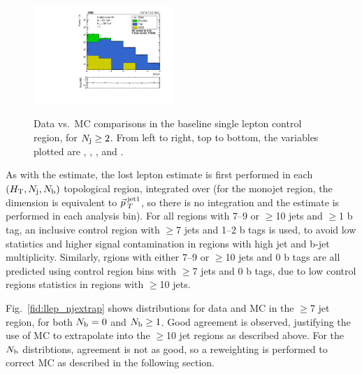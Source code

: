 \begin{figure}[ht]
\begin{center}
    \includegraphics[width=0.47\textwidth]{figs/llep/crslbase_nBJet20.pdf} \\
    \caption{Data vs.\ MC comparisons in the baseline single lepton control region, for $N_{\mathrm{j}}\geq2$.
      From left to right, top to bottom, the variables
      plotted are \Ht, \mttwo, \Nj, and \Nb.
            }
    \label{fig:llep_crplots}
  \end{center}
\end{figure}

As with the \znunu estimate,
the lost lepton estimate is first performed in each $(H_{\mathrm{T}},N_{\mathrm{j}},N_{\mathrm{b}})$ topological region, integrated
over \mttwo (for the monojet region, the \Ht dimension is equivalent to $\vec{p}_{\> T}^{\> \mathrm{jet1}}$,
so there is no integration and the estimate is performed in each analysis bin). For all regions
with 7--9 or $\geq$10 jets and $\geq$1 b tag, an inclusive control region with $\geq$7 jets and 1--2 b tags
is used, to avoid low statistics and higher signal contamination in regions with high jet and b-jet multiplicity.
Similarly, rgions with either 7--9 or $\geq$10 jets and 0 b tags are all predicted using control region bins
with $\geq$7 jets and 0 b tags, due to low control regions statistics in regions with $\geq$10 jets.

Fig.~\ref{fid:llep_njextrap} shows \Nj distributions for data and MC in the $\geq$7 jet region, for both $N_{\mathrm{b}}=0$
and $N_{\mathrm{b}}\geq1$. Good agreement is observed, justifying the use of MC to extrapolate into the $\geq$10 jet regions
as described above. For the $N_{\mathrm{b}}$ distribtions, agreement is not as good, so a reweighting is performed to correct
MC as described in the following section.

